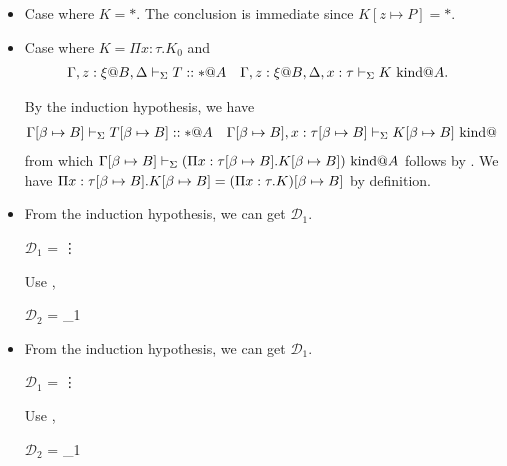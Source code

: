 \begin{itemize}
	\item[] Case \WStar{} where $K = *$.  The conclusion is immediate since $K[z \mapsto P] = *$.
	      	      	      	      
	\item[] Case \WAbs{} where $K = \Pi x:\tau.K_0$ and 
	      \begin{align*}
	      	  & \G, z:\xi@B, \D \V T::*@A &   & \G, z:\xi@B, \D, x:\tau \V K \iskind@A. 
	      \end{align*}
	      	      	      	      
	      	      	      	      
	      By the induction hypothesis, we have
	      \begin{align*}
	      	  & \GGV T\SB::*@A &   & \GG, x:\tau\SB \V K\SB \iskind@ 
	      \end{align*}
	      from which $\Gamma[\beta \mapsto B] \vdash_\Sigma (\Pi x:\tau[\beta \mapsto B].K[\beta \mapsto B]) \text{\ kind} @A$ follows by \WAbs.
	      We have $\Pi x:\tau[\beta \mapsto B].K[\beta \mapsto B] = (\Pi x:\tau.K)[\beta \mapsto B]$ by definition.
	      	      	      	              
	\item \WCsp
	      	      	      	      
	      From the induction hypothesis, we can get $\mathcal{D}_1$.
	      	      	      	      
	      $\mathcal{D}_1$ = 
	      {\vdots}
	      	      	      	      
	      Use \WCsp,
	      	      	      	      
	      $\mathcal{D}_2$ = 
	      {_1}
	      	      	      	      
	\item \WTW
	      	      	      	      
	      From the induction hypothesis, we can get $\mathcal{D}_1$.
	      	      	      	      
	      $\mathcal{D}_1$ = 
	      {\vdots}
	      	      	      	      
	      Use \WTW,
	      	      	      	      
	      $\mathcal{D}_2$ = 
	      {_1}
	      	      	      	      

\end{itemize}
